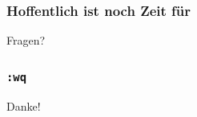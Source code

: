 \documentclass{beamer}
\begin{document}
\begin{frame}
  \frametitle{Hoffentlich ist noch Zeit für}
  \begin{center}
    \Huge Fragen?
  \end{center}
\end{frame}

\begin{frame}
  \frametitle{\texttt{:wq}}
  \begin{center}
    \Huge Danke!
  \end{center}
\end{frame}
\end{document}

